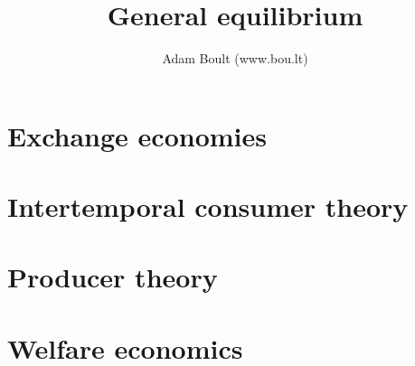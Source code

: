 \documentclass[oneside]{book}
\begin{document}
\author{Adam Boult (www.bou.lt)}
\title{General equilibrium}
\maketitle

\setcounter{tocdepth}{0}
\tableofcontents



\part{Exchange economies}





\part{Intertemporal consumer theory}






\part{Producer theory}




\part{Welfare economics}




\end{document}
